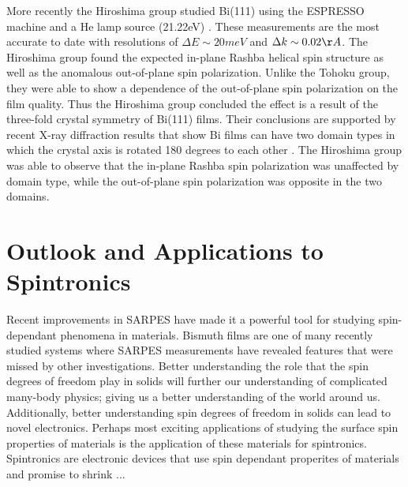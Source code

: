 \documentclass[12pt]{article}
\begin{document}
More recently the Hiroshima group studied Bi(111) using the ESPRESSO machine and a He lamp source (21.22eV) \cite{Miyahara}.
These measurements are the most accurate to date with resolutions of $\Delta E\sim20meV$ and $\Delta k\sim0.02\AA$.
The Hiroshima group found the expected in-plane Rashba helical spin structure as well as the anomalous out-of-plane spin polarization.
Unlike the Tohoku group, they were able to show a dependence of the out-of-plane spin polarization on the film quality.
Thus the Hiroshima group concluded the effect is a result of the three-fold crystal symmetry of Bi(111) films.
Their conclusions are supported by recent X-ray diffraction results that show Bi films can have two domain types in which the crystal axis is rotated 180 degrees to each other \cite{Shirasawa}.
The Hiroshima group was able to observe that the in-plane Rashba spin polarization was unaffected by domain type, while the out-of-plane spin polarization was opposite in the two domains.

\section{Outlook and Applications to Spintronics}
Recent improvements in SARPES have made it a powerful tool for studying spin-dependant phenomena in materials.
Bismuth films are one of many recently studied systems where SARPES measurements have revealed features that were missed by other investigations.
Better understanding the role that the spin degrees of freedom play in solids will further our understanding of complicated many-body physics; giving us a better understanding of the world around us.
Additionally, better understanding spin degrees of freedom in solids can lead to novel electronics.
Perhaps most exciting applications of studying the surface spin properties of materials is the application of these materials for spintronics.
Spintronics are electronic devices that use spin dependant properites of materials and promise to shrink ...

\printbibliography
\end{document}
